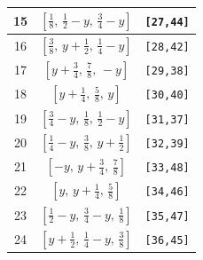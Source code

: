 \documentclass[fleqn,8pt]{jsarticle}
\begin{document}
\begin{longtable}{ccc}
15 & $\left[ \frac{1}{8},\, \frac{1}{2} - y,\, \frac{3}{4} - y \right]$ & {\tt [27,44]} \\ \hline
16 & $\left[ \frac{3}{8},\, y + \frac{1}{2},\, \frac{1}{4} - y \right]$ & {\tt [28,42]} \\ \hline
17 & $\left[ y + \frac{3}{4},\, \frac{7}{8},\, - y \right]$ & {\tt [29,38]} \\ \hline
18 & $\left[ y + \frac{1}{4},\, \frac{5}{8},\, y \right]$ & {\tt [30,40]} \\ \hline
19 & $\left[ \frac{3}{4} - y,\, \frac{1}{8},\, \frac{1}{2} - y \right]$ & {\tt [31,37]} \\ \hline
20 & $\left[ \frac{1}{4} - y,\, \frac{3}{8},\, y + \frac{1}{2} \right]$ & {\tt [32,39]} \\ \hline
21 & $\left[ - y,\, y + \frac{3}{4},\, \frac{7}{8} \right]$ & {\tt [33,48]} \\ \hline
22 & $\left[ y,\, y + \frac{1}{4},\, \frac{5}{8} \right]$ & {\tt [34,46]} \\ \hline
23 & $\left[ \frac{1}{2} - y,\, \frac{3}{4} - y,\, \frac{1}{8} \right]$ & {\tt [35,47]} \\ \hline
24 & $\left[ y + \frac{1}{2},\, \frac{1}{4} - y,\, \frac{3}{8} \right]$ & {\tt [36,45]} \\
\end{longtable}
\renewcommand{\arraystretch}{1.2}
\end{document}
